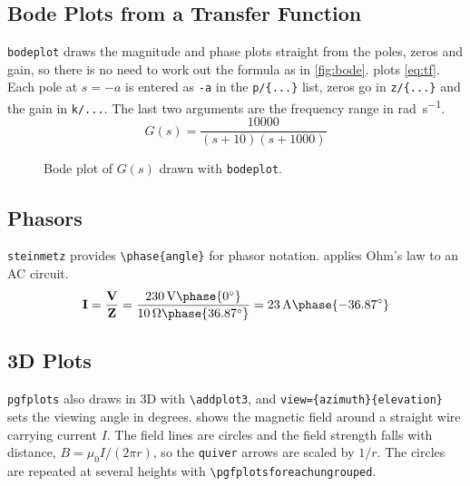 \subsection{Bode Plots from a Transfer Function}

\texttt{bodeplot} draws the magnitude and phase plots straight from the
poles, zeros and gain, so there is no need to work out the formula as in
\cref{fig:bode}.  plots \cref{eq:tf}. Each pole at
$s = -a$ is entered as \verb|-a| in the \verb|p/{...}| list, zeros go in
\verb|z/{...}| and the gain in \verb|k/...|. The last two arguments are
the frequency range in \unit{\radian\per\second}.
\begin{equation}
    G(s) = \frac{10000}{(s + 10)(s + 1000)}
    \label{eq:tf}
\end{equation}

\begin{figure}[H]
    \centering
    \caption{Bode plot of $G(s)$ drawn with \texttt{bodeplot}.}
    \label{fig:bodeplot}
\end{figure}

\subsection{Phasors}

\texttt{steinmetz} provides \verb|\phase{angle}| for phasor notation.
 applies Ohm's law to an AC circuit.
\begin{equation}
    \mathbf{I} = \frac{\mathbf{V}}{\mathbf{Z}}
    = \frac{\qty{230}{\volt}\phase{0^\circ}}{\qty{10}{\ohm}\phase{36.87^\circ}}
    = \qty{23}{\ampere}\phase{-36.87^\circ}
    \label{eq:phasor}
\end{equation}

\subsection{3D Plots}

\texttt{pgfplots} also draws in 3D with \verb|\addplot3|, and
\verb|view={azimuth}{elevation}| sets the viewing angle in degrees.
 shows the magnetic field around a straight wire
carrying current $I$. The field lines are circles and the field strength
falls with distance, $B = \mu_0 I / (2\pi r)$, so the \verb|quiver| arrows
are scaled by $1/r$. The circles are repeated at several heights with
\verb|\pgfplotsforeachungrouped|.

